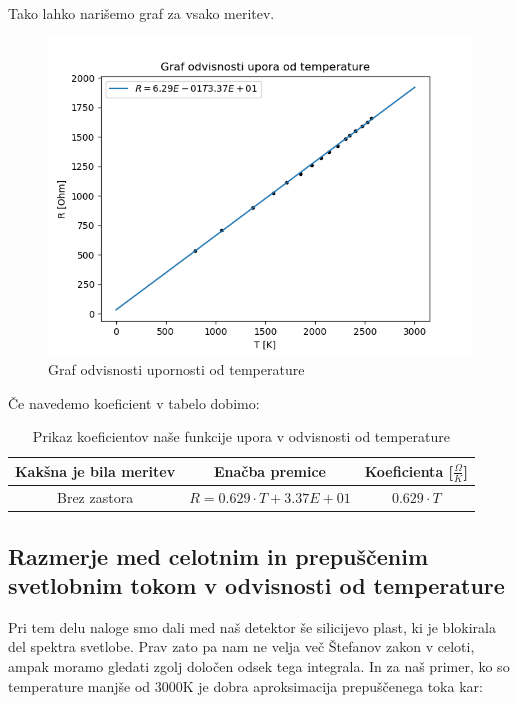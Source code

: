 \documentclass[11pt, a4paper]{article}
\theoremstyle{definition}
\theoremstyle{example}
\theoremstyle{izrek}
\begin{document}
Tako lahko narišemo graf za vsako meritev.
\begin{figure}[H]
	\centering
    \includegraphics[width=12cm]{Upor-Temperatura.png}
    \caption{Graf odvisnosti upornosti od temperature}
\end{figure}


Če navedemo koeficient v tabelo dobimo: 

\begin{table}[h]
	\centering
	\begin{tabular}{|c|c|c|}
		
		\hline
		Kakšna je bila meritev & Enačba premice & Koeficienta [$\frac{\Omega}{K}$]\\ [0.5ex] 
		\hline
		\hline
		Brez zastora & $R= 0.629 \cdot T +3.37E+01$ &$0.629 \cdot T$ \\
		\hline
		
	\end{tabular}
	\caption{Prikaz koeficientov naše funkcije upora v odvisnosti od temperature}	
\end{table}

\pagebreak
\subsection{Razmerje med celotnim in prepuščenim svetlobnim tokom v odvisnosti od temperature}

Pri tem delu naloge smo dali med naš detektor še silicijevo plast, ki je blokirala del spektra svetlobe. Prav zato pa nam ne velja več Štefanov zakon v celoti, ampak moramo gledati zgolj določen odsek tega integrala. In za naš primer, ko so temperature manjše od 3000K je dobra aproksimacija prepuščenega toka kar: 
\end{document}
